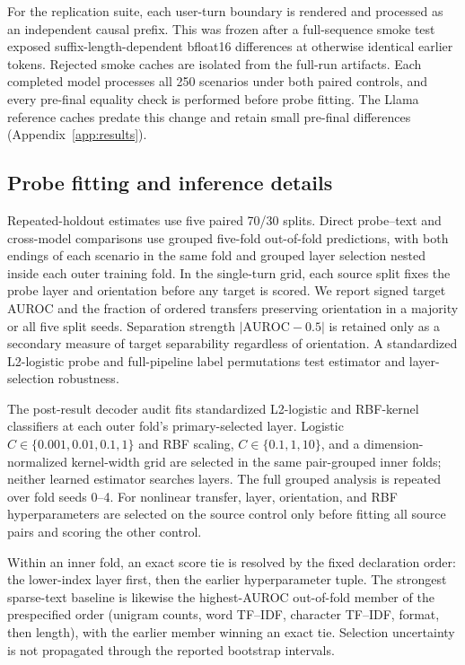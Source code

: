 \documentclass{article}
\begin{document}
For the replication suite, each user-turn boundary is rendered and processed
as an independent causal prefix. This was frozen after a full-sequence smoke
test exposed suffix-length-dependent bfloat16 differences at otherwise
identical earlier tokens. Rejected smoke caches are isolated from the full-run
artifacts. Each completed model processes all 250 scenarios under both paired
controls, and every pre-final equality check is performed before probe fitting.
The Llama reference caches predate this change and retain small pre-final
differences (Appendix~\ref{app:results}).

\subsection{Probe fitting and inference details}
\label{app:fitting-details}

Repeated-holdout estimates use five paired 70/30 splits. Direct probe--text and
cross-model comparisons use grouped five-fold out-of-fold predictions, with
both endings of each scenario in the same fold and grouped layer selection
nested inside each outer training fold. In the single-turn grid, each source
split fixes the probe layer and orientation before any target is scored. We
report signed target AUROC and the fraction of ordered transfers preserving
orientation in a majority or all five split seeds. Separation strength
$|\mathrm{AUROC}-0.5|$ is retained only as a secondary measure of target
separability regardless of orientation. A
standardized L2-logistic probe and full-pipeline label permutations test
estimator and layer-selection robustness.

The post-result decoder audit fits standardized L2-logistic and RBF-kernel
classifiers at each outer fold's primary-selected layer. Logistic
$C\in\{0.001,0.01,0.1,1\}$ and RBF scaling, $C\in\{0.1,1,10\}$, and a
dimension-normalized kernel-width grid are selected in the same pair-grouped
inner folds; neither learned estimator searches layers. The full grouped
analysis is repeated over fold seeds 0--4. For nonlinear transfer, layer,
orientation, and RBF hyperparameters are selected on the source control only
before fitting all source pairs and scoring the other control.

Within an inner fold, an exact score tie is resolved by the fixed declaration
order: the lower-index layer first, then the earlier hyperparameter tuple. The
strongest sparse-text baseline is likewise the highest-AUROC out-of-fold member
of the prespecified order (unigram counts, word TF--IDF, character TF--IDF,
format, then length), with the earlier member winning an exact tie. Selection
uncertainty is not propagated through the reported bootstrap intervals.
\end{document}
